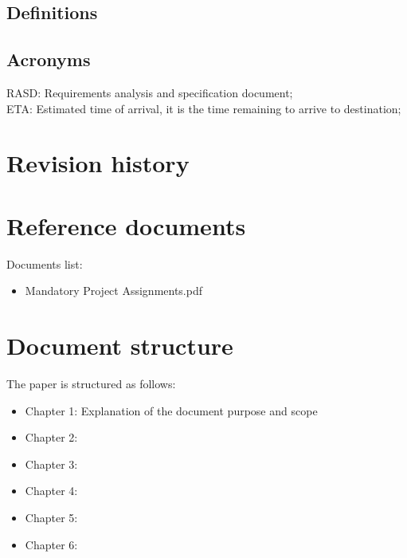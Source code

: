 \subsection{Definitions}
%
\subsection{Acronyms}
RASD: Requirements analysis and specification document; \\
ETA: Estimated time of arrival, it is the time remaining to arrive to destination;
%
\section{Revision history}
%
\section{Reference documents}
Documents list:
\begin{itemize}
\item Mandatory Project Assignments.pdf
\end{itemize}
%
\section{Document structure}
The paper is structured as follows:
\begin{itemize}
\item Chapter 1: Explanation of the document purpose and scope
\item Chapter 2:
\item Chapter 3:
\item Chapter 4:
\item Chapter 5:
\item Chapter 6:
\end{itemize}
%
